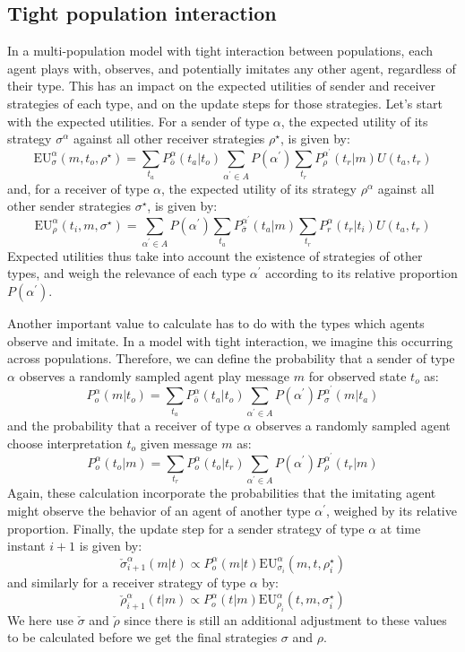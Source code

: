 \documentclass[a4paper]{article}
\begin{document}
\subsection{Tight population interaction}
\label{sec:tight-interaction-model}
In a multi-population model with tight interaction between populations, each agent plays with, observes, and potentially imitates any other agent, regardless of their type.
This has an impact on the expected utilities of sender and receiver strategies of each type, and on the update steps for those strategies.
Let's start with the expected utilities.
For a sender of type $\alpha$, the expected utility of its strategy $\sigma^\alpha$ against all other receiver strategies $\rho^\star$, is given by:
$$
\text{EU}_{\sigma}^{\alpha}(m,t_{o},\rho^{\star})=\sum_{t_{a}}P_{\bar{o}}^{\alpha}(t_{a}|t_{o})\sum_{\alpha^{\prime}\in A}P(\alpha^{\prime})\sum_{t_{r}}P_{\rho}^{\alpha^{\prime}}(t_{r}|m)U(t_{a},t_{r})
$$
and, for a receiver of type $\alpha$, the expected utility of its strategy $\rho^\alpha$ against all other sender strategies $\sigma^\star$, is given by:
$$
\text{EU}_{\rho}^{\alpha}(t_{i},m,\sigma^{\star})=\sum_{\alpha^{\prime}\in A}P(\alpha^{\prime})\sum_{t_{a}}P_{\bar{\sigma}}^{\alpha^{\prime}}(t_{a}|m)\sum_{t_{r}}P_{r}^{\alpha}(t_{r}|t_{i})U(t_{a},t_{r})
$$
Expected utilities thus take into account the existence of strategies of other types, and weigh the relevance of each type $\alpha^\prime$ according to its relative proportion $P(\alpha^\prime)$.

Another important value to calculate has to do with the types which agents observe and imitate.
In a model with tight interaction, we imagine this occurring across populations.
Therefore, we can define the probability that a sender of type $\alpha$ observes a randomly sampled agent play message $m$ for observed state $t_o$ as:
$$
P_{o}^{\alpha}(m|t_{o})=\sum_{t_{a}}P_{\bar{o}}^{\alpha}(t_{a}|t_{o})\sum_{\alpha^{\prime}\in A}P(\alpha^{\prime})P_{\sigma}^{\alpha^{\prime}}(m|t_{a})
$$
and the probability that a receiver of type $\alpha$ observes a randomly sampled agent choose interpretation $t_o$ given message $m$ as:
$$
P_{o}^{\alpha}(t_{o}|m)=\sum_{t_{r}}P_{o}^{\alpha}(t_{o}|t_{r})\sum_{\alpha^{\prime}\in A}P(\alpha^{\prime})P_{\rho}^{\alpha^{\prime}}(t_{r}|m)
$$
Again, these calculation incorporate the probabilities that the imitating agent might observe the behavior of an agent of another type $\alpha^\prime$, weighed by its relative proportion.
%
Finally, the update step for a sender strategy of type $\alpha$ at time instant $i+1$ is given by:
$$
\check{\sigma}_{i+1}^{\alpha}(m|t) \propto P_{o}^{\alpha}(m|t)\text{EU}_{\sigma_{i}}^{\alpha}(m,t,\rho_{i}^{\star})
$$
and similarly for a receiver strategy of type $\alpha$ by:
$$
\check{\rho}_{i+1}^{\alpha}(t|m) \propto P_{o}^{\alpha}(t|m)\text{EU}_{\rho_{i}}^{\alpha}(t,m,\sigma_{i}^{\star})
$$
We here use $\check{\sigma}$ and $\check{\rho}$ since there is still an additional adjustment to these values to be calculated before we get the final strategies $\sigma$ and $\rho$.
\end{document}
